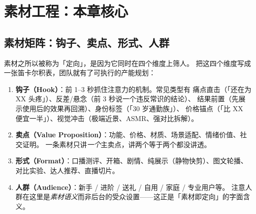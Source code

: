 \section{素材工程：本章核心}
\label{sec:meta-creative}

\subsection{素材矩阵：钩子、卖点、形式、人群}

素材之所以被称为「定向」，是因为它同时在四个维度上筛人。
把这四个维度写成一张笛卡尔积表，团队就有了可执行的产能规划：

\begin{enumerate}
  \item \textbf{钩子（Hook）}：前 1--3 秒抓住注意力的机制。常见类型有
        痛点直击（「还在为 XX 头疼」）、反差/悬念（前 3 秒说一个违反常识的结论）、
        结果前置（先展示使用后的效果再回溯）、身份标签（「30 岁通勤族」）、
        价格锚点（「比 XX 便宜一半」）、视觉冲击（极端近景、ASMR、强对比拆解）。
  \item \textbf{卖点（Value Proposition）}：功能、价格、材质、场景适配、情绪价值、社交证明。
        一条素材只讲\emph{一个}主卖点，讲两个等于两个都没讲透。
  \item \textbf{形式（Format）}：口播测评、开箱、剧情、纯展示（静物快剪）、图文轮播、
        对比实验、达人推荐、直播切片。
  \item \textbf{人群（Audience）}：新手 / 进阶 / 送礼 / 自用 / 家庭 / 专业用户等。
        注意人群在这里是\emph{素材语义}而非后台的受众设置——这正是「素材即定向」的字面含义。
\end{enumerate}

